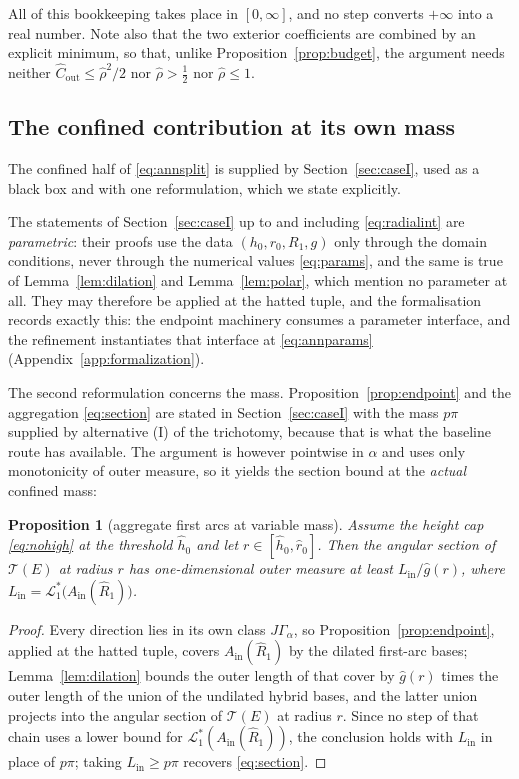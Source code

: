 \documentclass[11pt]{article}
\theoremstyle{plain}
\newtheorem{proposition}[theorem]{Proposition}
\theoremstyle{definition}
\theoremstyle{remark}
\newcommand{\Lone}{\mathcal{L}^{*}_{1}}
\newcommand{\Ain}{A_{\mathrm{in}}}
\newcommand{\Tri}{\mathcal{T}}
\begin{document}
All of this bookkeeping takes place in $[0,\infty]$, and no step converts
$+\infty$ into a real number. Note also that the two exterior coefficients are
combined by an explicit minimum, so that, unlike
Proposition~\ref{prop:budget}, the argument needs neither
$\hat C_{\mathrm{out}}\le\hat\rho^{2}/2$ nor $\hat\rho>\tfrac12$ nor
$\hat\rho\le1$.

\subsection{The confined contribution at its own mass}\label{sec:annconfined}

The confined half of \eqref{eq:annsplit} is supplied by
Section~\ref{sec:caseI}, used as a black box and with one reformulation, which
we state explicitly.

The statements of Section~\ref{sec:caseI} up to and including
\eqref{eq:radialint} are \emph{parametric}: their proofs use the data
$(h_{0},r_{0},R_{1},g)$ only through the domain conditions, never through the
numerical values \eqref{eq:params}, and the same is true of
Lemma~\ref{lem:dilation} and Lemma~\ref{lem:polar}, which mention no parameter
at all. They may therefore be applied at the hatted tuple, and the
formalisation records exactly this: the endpoint machinery consumes a
parameter interface, and the refinement instantiates that interface at
\eqref{eq:annparams} (Appendix~\ref{app:formalization}).

The second reformulation concerns the mass. Proposition~\ref{prop:endpoint} and
the aggregation \eqref{eq:section} are stated in Section~\ref{sec:caseI} with
the mass $p\pi$ supplied by alternative (I) of the trichotomy, because that is
what the baseline route has available. The argument is however pointwise in
$\alpha$ and uses only monotonicity of outer measure, so it yields the section
bound at the \emph{actual} confined mass:

\begin{proposition}[aggregate first arcs at variable mass]\label{prop:annsection}
Assume the height cap \eqref{eq:nohigh} at the threshold $\hat h_{0}$ and let
$r\in[\hat h_{0},\hat r_{0}]$. Then the angular section of $\Tri(E)$ at radius
$r$ has one-dimensional outer measure at least
$L_{\mathrm{in}}/\hat g(r)$, where
$L_{\mathrm{in}}=\Lone\bigl(\Ain(\hat R_{1})\bigr)$.
\end{proposition}

\begin{proof}
Every direction lies in its own class $J\Gamma_{\alpha}$, so
Proposition~\ref{prop:endpoint}, applied at the hatted tuple, covers
$\Ain(\hat R_{1})$ by the dilated first-arc bases;
Lemma~\ref{lem:dilation} bounds the outer length of that cover by $\hat g(r)$
times the outer length of the union of the undilated hybrid bases, and the
latter union projects into the angular section of $\Tri(E)$ at radius $r$.
Since no step of that chain uses a lower bound for
$\Lone(\Ain(\hat R_{1}))$, the conclusion holds with $L_{\mathrm{in}}$ in place
of $p\pi$; taking $L_{\mathrm{in}}\ge p\pi$ recovers \eqref{eq:section}.
\end{proof}
\end{document}
